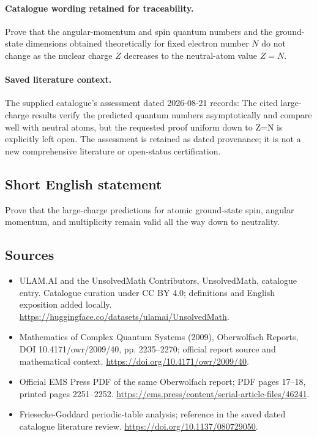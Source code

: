 \documentclass[11pt]{article}
\begin{document}
\paragraph{Catalogue wording retained for traceability.}
Prove that the angular-momentum and spin quantum numbers and the ground-state dimensions obtained theoretically for fixed electron number $N$ do not change as the nuclear charge $Z$ decreases to the neutral-atom value $Z=N$.

\paragraph{Saved literature context.} The supplied catalogue's assessment dated 2026-08-21 records: The cited large-charge results verify the predicted quantum numbers asymptotically and compare well with neutral atoms, but the requested proof uniform down to Z=N is explicitly left open. The assessment is retained as dated provenance; it is not a new comprehensive literature or open-status certification.
\subsection{Short English statement}
Prove that the large-charge predictions for atomic ground-state spin, angular momentum, and multiplicity remain valid all the way down to neutrality.
\subsection{Sources}
\begin{itemize}
\item[\hypertarget{source:statement:1}{S1}] ULAM.AI and the UnsolvedMath Contributors, UnsolvedMath, catalogue entry. Catalogue curation under CC BY 4.0; definitions and English exposition added locally.
\url{https://huggingface.co/datasets/ulamai/UnsolvedMath}.
\item[\hypertarget{source:statement:2}{S2}] Mathematics of Complex Quantum Systems (2009), Oberwolfach Reports, DOI 10.4171/owr/2009/40, pp. 2235--2270; official report source and mathematical context.
\url{https://doi.org/10.4171/owr/2009/40}.
\item[\hypertarget{source:statement:3}{S3}] Official EMS Press PDF of the same Oberwolfach report; PDF pages 17--18, printed pages 2251--2252.
\url{https://ems.press/content/serial-article-files/46241}.
\item[\hypertarget{source:statement:4}{S4}] Friesecke-Goddard periodic-table analysis; reference in the saved dated catalogue literature review.
\url{https://doi.org/10.1137/080729050}.
\end{itemize}
\label{end:statement}
\end{document}
